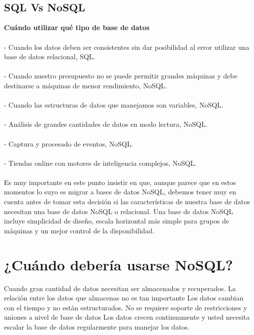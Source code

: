 \documentclass[twoside,twocolumn]{article}
\begin{document}
\begin{flushright}
\begin{itemize}
\textbf{}\\
\textbf{}\\

\subsection{SQL Vs NoSQL }
\textbf{Cuándo utilizar qué tipo de base de datos}\\
\textbf{}\\
-	Cuando los datos deben ser consistentes sin dar posibilidad al error utilizar una base de datos relacional, SQL.\\
\textbf{}\\
-	Cuando nuestro presupuesto no se puede permitir grandes máquinas y debe destinarse a máquinas de menor rendimiento, NoSQL.\\
\textbf{}\\
-	Cuando las estructuras de datos que manejamos son variables, NoSQL.\\
\textbf{}\\
-	Análisis de grandes cantidades de datos en modo lectura, NoSQL.\\
\textbf{}\\
-	Captura y procesado de eventos, NoSQL.\\
\textbf{}\\
-	Tiendas online con motores de inteligencia complejos, NoSQL.\\
\textbf{}\\

Es muy importante en este punto insistir en que, aunque parece que en estos momentos lo suyo es migrar a bases de datos NoSQL, debemos tener muy en cuenta antes de tomar esta decisión si las características de nuestra base de datos necesitan una base de datos NoSQL o relacional.
Una base de datos NoSQL incluye simplicidad de diseño, escala horizontal más simple para grupos de máquinas y un mejor control de la disponibilidad.

\section{¿Cuándo debería usarse NoSQL?}

Cuando gran cantidad de datos necesitan ser almacenados y recuperados.
La relación entre los datos que almacenas no es tan importante
Los datos cambian con el tiempo y no están estructurados.
No se requiere soporte de restricciones y uniones a nivel de base de datos
Los datos crecen continuamente y usted necesita escalar la base de datos regularmente para manejar los datos.



\end{itemize}
\end{flushright}
\end{document}
